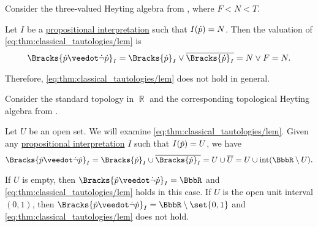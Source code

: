 \begin{example}\label{ex:heyting_semantics_lem_counterexample}
  Consider the three-valued Heyting algebra from , where \( F < N < T \).

  Let \( I \) be a \hyperref[def:propositional_valuation]{propositional interpretation} such that \( I({\dot{p}}) = N \). Then the valuation of \eqref{eq:thm:classical_tautologies/lem} is
  \begin{equation*}
    \Bracks{\synp \synvee \synneg \synp}_I
    =
    \Bracks{\synp}_I \vee \oline{\Bracks{\synp}_I}
    =
    N \vee F
    =
    N.
  \end{equation*}

  Therefore, \eqref{eq:thm:classical_tautologies/lem} does not hold in general.
\end{example}

\begin{example}\label{ex:topological_semantics_lem_counterexample}
  Consider the standard topology in \( \BbbR \) and the corresponding topological Heyting algebra from .

  Let \( U \) be an open set. We will examine \eqref{eq:thm:classical_tautologies/lem}. Given any \hyperref[def:propositional_valuation]{propositional interpretation} \( I \) such that \( I({\dot{p}}) = U \), we have
  \begin{equation*}
    \Bracks{\synp \synvee \synneg \synp}_I
    =
    \Bracks{\synp}_I \cup \oline{\Bracks{\synp}_I}
    =
    U \cup \oline{U}
    =
    U \cup \Int(\BbbR \setminus U).
  \end{equation*}

  If \( U \) is empty, then \( \Bracks{\synp \synvee \synneg \synp}_I = \BbbR \) and \eqref{eq:thm:classical_tautologies/lem} holds in this case. If \( U \) is the open unit interval \( (0, 1) \), then \( \Bracks{\synp \synvee \synneg \synp}_I = \BbbR \setminus \set{ 0, 1 } \) and \eqref{eq:thm:classical_tautologies/lem} does not hold.
\end{example}

